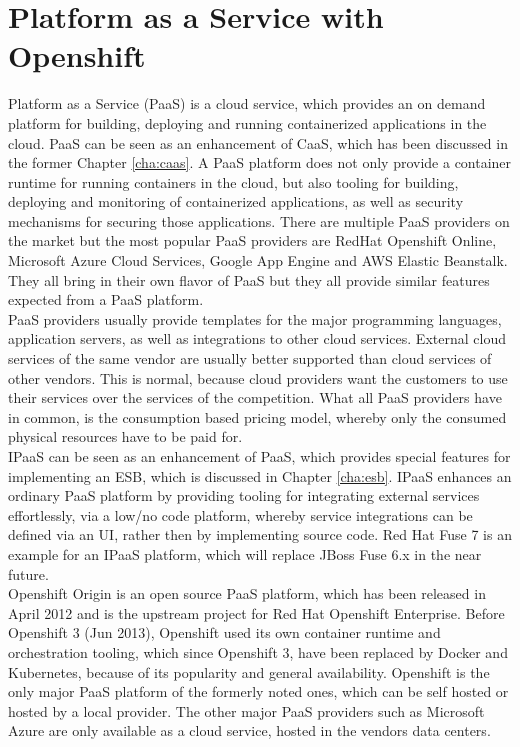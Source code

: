\chapter{Platform as a Service with Openshift}
\label{cha:paas}
Platform as a Service (PaaS) is a cloud service, which provides an on demand platform for building, deploying and running containerized applications in the cloud. PaaS can be seen as an enhancement of CaaS, which has been discussed in the former Chapter \vref{cha:caas}. A PaaS platform does not only provide a container runtime for running containers in the cloud, but also tooling for building, deploying and monitoring of containerized applications, as well as security mechanisms for securing those applications. There are multiple PaaS providers on the market but the most popular PaaS providers are RedHat Openshift Online, Microsoft Azure Cloud Services, Google App Engine and AWS Elastic Beanstalk. They all bring in their own flavor of PaaS but they all provide similar features expected from a PaaS platform\cite{OpenshiftOnline2018, MicrosoftAzueCloudServices2018, GoogleCloudAE2018, AmazonWebServicesEBT2018}. \\

PaaS providers usually provide templates for the major programming languages, application servers, as well as integrations to other cloud services. External cloud services of the same vendor are usually better supported than cloud services of other vendors. This is normal, because cloud providers want the customers to use their services over the services of the competition. What all PaaS providers have in common, is the consumption based pricing model, whereby only the consumed physical resources have to be paid for. \\ 

IPaaS can be seen as an enhancement of PaaS, which provides special features for implementing an ESB, which is discussed in Chapter \vref{cha:esb}. IPaaS enhances an ordinary PaaS platform by providing tooling for integrating external services effortlessly, via a low/no code platform, whereby service integrations can be defined via an UI, rather then by implementing source code. Red Hat Fuse 7 is an example for an IPaaS platform, which will replace JBoss Fuse 6.x in the near future\cite{Fuse72018, iPaaSP12015, iPaaSP22015}. \\

Openshift Origin is an open source PaaS platform, which has been released in April 2012 and is the upstream project for Red Hat Openshift Enterprise. Before Openshift 3 (Jun 2013), Openshift used its own container runtime and orchestration tooling, which since Openshift 3, have been replaced by Docker and Kubernetes, because of its popularity and general availability. Openshift is the only major PaaS platform of the formerly noted ones, which can be self hosted or hosted by a local provider. The other major PaaS providers such as Microsoft Azure are only available as a cloud service, hosted in the vendors data centers\cite{OpenshiftOriginGithub2018}.

